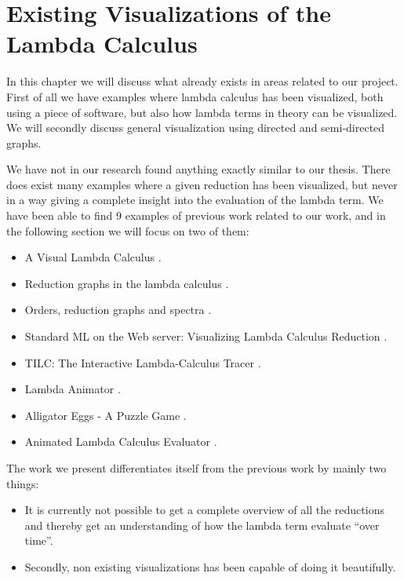 
\chapter{Existing Visualizations of the Lambda Calculus}

In this chapter we will discuss what already exists in areas related to our
project. First of all we have examples where lambda calculus has been
visualized, both using a piece of software, but also how lambda terms in
theory can be visualized. We will secondly discuss general visualization using
directed and semi-directed graphs.

We have not in our research found anything exactly similar to our thesis.
There does exist many examples where a given reduction has been visualized,
but never in a way giving a complete insight into the evaluation of the lambda
term. We have been able to find 9 examples of previous work related to our
work, and in the following section we will focus on two of them:

\begin{itemize}
	\item A Visual Lambda Calculus \cite{Citrin+Hall+Zorn+1995a}.
	\item Reduction graphs in the lambda calculus \cite{VenturiniZilli1984251}.
	\item Orders, reduction graphs and spectra \cite{297368}.
	\item Standard ML on the Web server: Visualizing Lambda Calculus Reduction \cite{Sestoft96standardml}.
	\item TILC: The Interactive Lambda-Calculus Tracer \cite{DBLP:journals/entcs/RuizV09}.
	\item Lambda Animator \cite{lambdaAnimatorThyer}.
	\item Alligator Eggs - A Puzzle Game \cite{Alligator}.
	\item Animated Lambda Calculus Evaluator \cite{AnimatedLambdaCalculusEvaluator}.
\end{itemize}


The work we present differentiates itself from the previous work by mainly two
things:

\begin{itemize}
	\item It is currently not possible to get a complete overview of all
	      the reductions and thereby get an understanding of how the lambda
	      term evaluate ``over time''.
	\item Secondly, non existing visualizations has been capable of doing
	      it beautifully.
\end{itemize}

